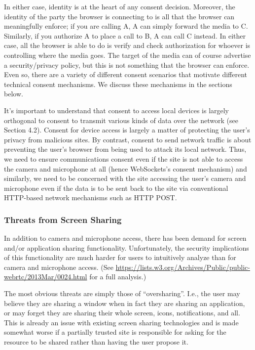 \documentclass{article}
\begin{document}
In either case, identity is at the heart of any consent decision.
Moreover, the identity of the party the browser is connecting to is
all that the browser can meaningfully enforce; if you are calling A,
A can simply forward the media to C.  Similarly, if you authorize A
to place a call to B, A can call C instead.  In either case, all the
browser is able to do is verify and check authorization for whoever
is controlling where the media goes.  The target of the media can of
course advertise a security/privacy policy, but this is not something
that the browser can enforce.  Even so, there are a variety of
different consent scenarios that motivate different technical consent
mechanisms.  We discuss these mechanisms in the sections below.

It's important to understand that consent to access local devices is
largely orthogonal to consent to transmit various kinds of data over
the network (see Section 4.2).  Consent for device access is largely
a matter of protecting the user's privacy from malicious sites.  By
contrast, consent to send network traffic is about preventing the
user's browser from being used to attack its local network.  Thus, we
need to ensure communications consent even if the site is not able to
access the camera and microphone at all (hence WebSockets's consent
mechanism) and similarly, we need to be concerned with the site
accessing the user's camera and microphone even if the data is to be
sent back to the site via conventional HTTP-based network mechanisms
such as HTTP POST.

\subsubsection{Threats from Screen Sharing}

In addition to camera and microphone access, there has been demand
for screen and/or application sharing functionality.  Unfortunately,
the security implications of this functionality are much harder for
users to intuitively analyze than for camera and microphone access.
(See \url{https://lists.w3.org/Archives/Public/public-webrtc/2013Mar/0024.html}
for a full analysis.)

The most obvious threats are simply those of ``oversharing''.  I.e.,
the user may believe they are sharing a window when in fact they are
sharing an application, or may forget they are sharing their whole
screen, icons, notifications, and all.  This is already an issue with
existing screen sharing technologies and is made somewhat worse if a
partially trusted site is responsible for asking for the resource to
be shared rather than having the user propose it.
\end{document}
